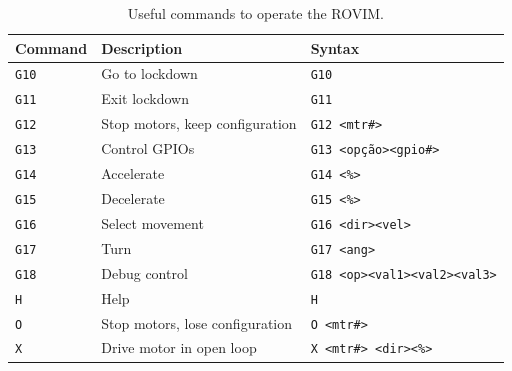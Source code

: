 \documentclass[journal]{IEEEtran}
\begin{document}
\begin{table}[!t]

    \renewcommand{\arraystretch}{1.3}
        \caption{Useful commands to operate the ROVIM.}
        \label{tab:comandos_rovim}
        \centering
        \begin{tabular}{@{} m{} m{} m{} @{}}
            \hline
            Command & Description & Syntax\\
            \hline
            \texttt{G10} & Go to lockdown & \texttt{G10}\\
            \texttt{G11} & Exit lockdown & \texttt{G11}\\
            \texttt{G12} & Stop motors, keep configuration & \texttt{G12 <mtr\#>}\\
            \texttt{G13} & Control GPIOs & \texttt{G13 <opção><gpio\#>}\\
            \texttt{G14} & Accelerate & \texttt{G14 <\%>}\\
            \texttt{G15} & Decelerate & \texttt{G15 <\%>}\\
            \texttt{G16} & Select movement & \texttt{G16 <dir><vel>}\\
            \texttt{G17} & Turn & \texttt{G17 <ang>}\\
            \texttt{G18} & Debug control & \texttt{G18 <op><val1><val2><val3>}\\
            \texttt{H} & Help & \texttt{H}\\
            \hline
            \texttt{O} & Stop motors, lose configuration & \texttt{O <mtr\#>}\\
            \texttt{X} & Drive motor in open loop & \texttt{X <mtr\#> <dir><\%>}\\
            \hline
        \end{tabular}

\end{table}

%
%
\end{document}
